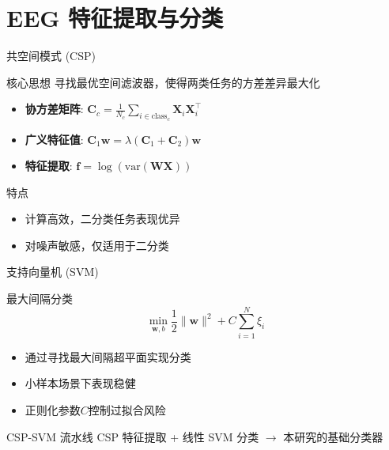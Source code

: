 \section{EEG 特征提取与分类}

\begin{frame}{共空间模式 (CSP)}
    \begin{block}{核心思想}
        寻找最优空间滤波器，使得两类任务的方差差异最大化
    \end{block}
    
    \vspace{0.5cm}
    \begin{itemize}
        \item \textbf{协方差矩阵}: $\mathbf{C}_c = \frac{1}{N_c} \sum_{i \in \text{class}_c} \mathbf{X}_i \mathbf{X}_i^\top$
        \item \textbf{广义特征值}: $\mathbf{C}_1 \mathbf{w} = \lambda (\mathbf{C}_1 + \mathbf{C}_2) \mathbf{w}$
        \item \textbf{特征提取}: $\mathbf{f} = \log \left( \text{var}(\mathbf{W} \mathbf{X}) \right)$
    \end{itemize}
    
    \vspace{0.5cm}
    \begin{alertblock}{特点}
        \begin{itemize}
            \item 计算高效，二分类任务表现优异
            \item 对噪声敏感，仅适用于二分类
        \end{itemize}
    \end{alertblock}
\end{frame}

\begin{frame}{支持向量机 (SVM)}
    \begin{block}{最大间隔分类}
        \[
        \min_{\mathbf{w}, b} \frac{1}{2} \|\mathbf{w}\|^2 + C \sum_{i=1}^N \xi_i
        \]
    \end{block}
    
    \vspace{0.5cm}
    \begin{itemize}
        \item 通过寻找最大间隔超平面实现分类
        \item 小样本场景下表现稳健
        \item 正则化参数$C$控制过拟合风险
    \end{itemize}
    
    \vspace{0.5cm}
    \begin{exampleblock}{CSP-SVM 流水线}
        CSP 特征提取 + 线性 SVM 分类 $\rightarrow$ 本研究的基础分类器
    \end{exampleblock}
\end{frame}

